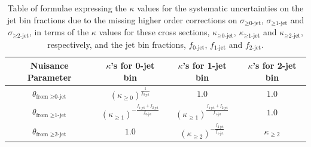 \begin{table}[!htbp]
\begin{center}
\label{tab:jetbinformula}
\vspace{0.5cm} 
\caption{Table of formulae expressing the $\kappa$ values for the systematic uncertainties on the
jet bin fractions due to the missing higher order corrections on 
$\sigma_{\ge\textrm{0-jet}}$, $\sigma_{\ge\textrm{1-jet}}$ and $\sigma_{\ge\textrm{2-jet}}$,
in terms of the $\kappa$ values for these cross sections, 
$\kappa_{\ge\textrm{0-jet}}$, $\kappa_{\ge\textrm{1-jet}}$ and $\kappa_{\ge\textrm{2-jet}}$, 
respectively, and the jet bin fractions, 
$f_{\textrm{0-jet}}$, $f_{\textrm{1-jet}}$ and $f_{\textrm{2-jet}}$.}
\vspace{0.5cm} 
\begin{tabular}{c|ccc}
\hline
Nuisance Parameter & $\kappa$'s for 0-jet bin   & $\kappa$'s for 1-jet bin  & $\kappa$'s for 2-jet bin                       \\
\hline \hline
$\theta_{\textrm{from } \ge \textrm{0-jet}}$  & $ (\kappa_{\geq 0})^{\frac{1}{f_\textrm{0-jet}}}$    & $1.0$ & $1.0$                                            \\
$\theta_{\textrm{from } \ge \textrm{1-jet}}$  & $(\kappa_{\geq 1})^{- \frac{f_\textrm{1-jet}+f_\textrm{2-jet}}{f_\textrm{0-jet}}}$ & $(\kappa_{\geq 1})^{\frac{f_\textrm{1-jet}+f_\textrm{2-jet}}{f_\textrm{1-jet}}}$  & $1.0$                                            \\
$\theta_{\textrm{from } \ge \textrm{2-jet}}$  & $1.0$ & $(\kappa_{\geq 2})^{- \frac{f_\textrm{2-jet}}{f_\textrm{1-jet}}} $     & $\kappa_{\geq 2}$ \\
\hline

\end{tabular}
\end{center}
\end{table}

